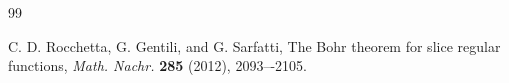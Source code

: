 \documentclass[a4paper,11pt, reqno]{amsart}
\theoremstyle{definition}
\begin{document}
\begin{thebibliography}{99}
	
		 {\sc C. D. Rocchetta, G. Gentili}, and {\sc G. Sarfatti}, The Bohr theorem for slice regular functions, {\it Math. Nachr.} \textbf{285} (2012), 2093–-2105.
	
	
	
	
	
	
	
	
	
	
	
	
	

\end{thebibliography}
\end{document}
